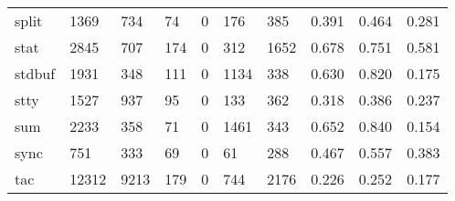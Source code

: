 \begin{longtable}{lp{2.0cm}p{2.0cm}p{2.0cm}p{2.0cm}p{2.0cm}p{2.0cm}p{2.0cm}p{2.0cm}p{2.0cm}}
split     &                   1369 &                                734 &                                74 &                                0 &                               176 &                             385 &                                0.391 &                                  0.464 &                                0.281 \\
stat      &                   2845 &                                707 &                               174 &                                0 &                               312 &                            1652 &                                0.678 &                                  0.751 &                                0.581 \\
stdbuf    &                   1931 &                                348 &                               111 &                                0 &                              1134 &                             338 &                                0.630 &                                  0.820 &                                0.175 \\
stty      &                   1527 &                                937 &                                95 &                                0 &                               133 &                             362 &                                0.318 &                                  0.386 &                                0.237 \\
sum       &                   2233 &                                358 &                                71 &                                0 &                              1461 &                             343 &                                0.652 &                                  0.840 &                                0.154 \\
sync      &                    751 &                                333 &                                69 &                                0 &                                61 &                             288 &                                0.467 &                                  0.557 &                                0.383 \\
tac       &                  12312 &                               9213 &                               179 &                                0 &                               744 &                            2176 &                                0.226 &                                  0.252 &                                0.177 \\

\end{longtable}
